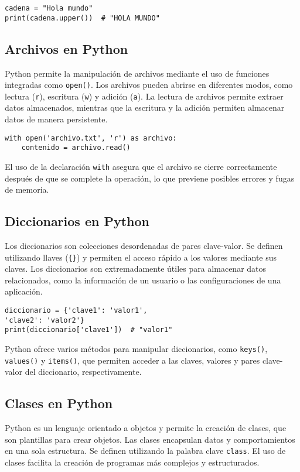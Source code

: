 \documentclass[conference]{IEEEtran}
\begin{document}
\begin{verbatim}
cadena = "Hola mundo"
print(cadena.upper())  # "HOLA MUNDO"
\end{verbatim}

    \subsection{Archivos en Python}
Python permite la manipulación de archivos mediante el uso de funciones integradas como \texttt{open()}. Los archivos pueden abrirse en diferentes modos, como lectura (\texttt{r}), escritura (\texttt{w}) y adición (\texttt{a}). La lectura de archivos permite extraer datos almacenados, mientras que la escritura y la adición permiten almacenar datos de manera persistente.

\begin{verbatim}
with open('archivo.txt', 'r') as archivo:
    contenido = archivo.read()
\end{verbatim}

El uso de la declaración \texttt{with} asegura que el archivo se cierre correctamente después de que se complete la operación, lo que previene posibles errores y fugas de memoria.

    \subsection{Diccionarios en Python}
Los diccionarios son colecciones desordenadas de pares clave-valor. Se definen utilizando llaves (\texttt{\{\}}) y permiten el acceso rápido a los valores mediante sus claves. Los diccionarios son extremadamente útiles para almacenar datos relacionados, como la información de un usuario o las configuraciones de una aplicación.

\begin{verbatim}
diccionario = {'clave1': 'valor1', 
'clave2': 'valor2'}
print(diccionario['clave1'])  # "valor1"
\end{verbatim}

Python ofrece varios métodos para manipular diccionarios, como \texttt{keys()}, \texttt{values()} y \texttt{items()}, que permiten acceder a las claves, valores y pares clave-valor del diccionario, respectivamente.

    \subsection{Clases en Python}
Python es un lenguaje orientado a objetos y permite la creación de clases, que son plantillas para crear objetos. Las clases encapsulan datos y comportamientos en una sola estructura. Se definen utilizando la palabra clave \texttt{class}. El uso de clases facilita la creación de programas más complejos y estructurados.
\end{document}
